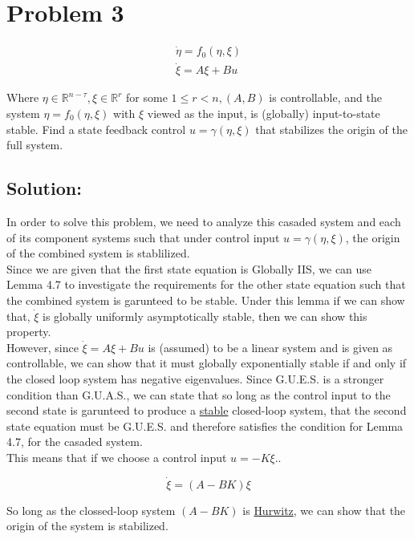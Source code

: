 \section*{Problem 3}


$$
\begin{array}{l}
\dot{\eta}=f_{0}(\eta, \xi) \\
\dot{\xi}=A \xi+B u
\end{array}
$$


Where $\eta \in \mathbb{R}^{n-\tau}, \xi \in \mathbb{R}^{r}$ for some $1 \leq r<n,(A, B)$ is controllable, and the system $\eta=f_{0}(\eta, \xi)$ with $\xi$ viewed as the input, is (globally) input-to-state stable. Find a state feedback control $u=\gamma(\eta, \xi)$ that stabilizes the origin of the full system.\\

\subsection*{Solution:}

\noindent In order to solve this problem, we need to analyze this casaded system and each of its component systems such that under control input $u = \gamma(\eta, \xi)$, the origin of the combined system is stablilized. \\

\noindent Since we are given that the first state equation is Globally IIS, we can use Lemma 4.7 to investigate the requirements for the other state equation such that the combined system is garunteed to be stable. Under this lemma if we can show that, $\dot{\xi}$ is globally uniformly asymptotically stable, then we can show this property. \\

\noindent However, since $\dot{\xi}=A \xi+B u$ is (assumed) to be a linear system and is given as controllable, we can show that it must globally exponentially stable if and only if the closed loop system has negative eigenvalues. Since G.U.E.S. is a stronger condition than G.U.A.S., we can state that so long as the control input to the second state is garunteed to produce a \underline{stable} closed-loop system, that the second state equation must be G.U.E.S. and therefore satisfies the condition for Lemma 4.7, for the casaded system. \\

\noindent This means that if we choose a control input $u = -K\xi$..


$$
\dot{\xi}= (A -BK)\xi
$$

\noindent So long as the clossed-loop system $(A -BK) $ is \underline{Hurwitz}, we can show that the origin of the system is stabilized.
